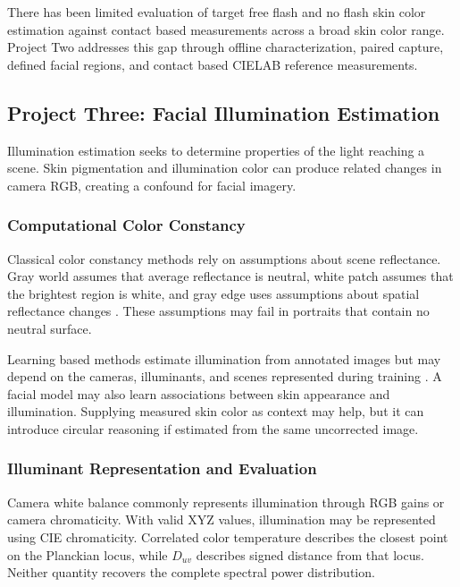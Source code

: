 \documentclass[12pt]{article}
\begin{document}
There has been limited evaluation of target free flash and no flash skin color estimation against contact based measurements across a broad skin color range. Project Two addresses this gap through offline characterization, paired capture, defined facial regions, and contact based CIELAB reference measurements.

\subsection{Project Three: Facial Illumination Estimation}

Illumination estimation seeks to determine properties of the light reaching a scene. Skin pigmentation and illumination color can produce related changes in camera RGB, creating a confound for facial imagery.

\subsubsection{Computational Color Constancy}

Classical color constancy methods rely on assumptions about scene reflectance. Gray world assumes that average reflectance is neutral, white patch assumes that the brightest region is white, and gray edge uses assumptions about spatial reflectance changes \cite{gijsenij2011}. These assumptions may fail in portraits that contain no neutral surface.

Learning based methods estimate illumination from annotated images but may depend on the cameras, illuminants, and scenes represented during training \cite{xie2023}. A facial model may also learn associations between skin appearance and illumination. Supplying measured skin color as context may help, but it can introduce circular reasoning if estimated from the same uncorrected image.

\subsubsection{Illuminant Representation and Evaluation}

Camera white balance commonly represents illumination through RGB gains or camera chromaticity. With valid XYZ values, illumination may be represented using CIE chromaticity. Correlated color temperature describes the closest point on the Planckian locus, while \(D_{uv}\) describes signed distance from that locus. Neither quantity recovers the complete spectral power distribution.
\end{document}
